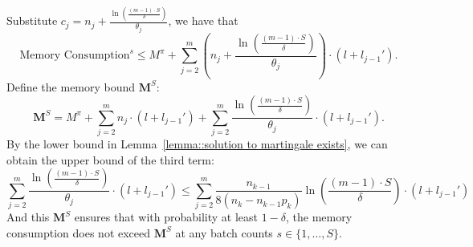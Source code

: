 Substitute \(c_j = n_j + \frac{\ln\left( \frac{(m - 1) \cdot S}{\delta} \right)}{\theta_j} \), we have that
$$    \text{Memory Consumption}^s \leq M^{\pi} + \sum_{j=2}^m \left( n_j + \frac{\ln\left( \frac{(m - 1) \cdot S}{\delta} \right)}{\theta_j} \right) \cdot (l + l_{j-1}').$$
Define the memory bound \( \mathbf{M}^S \):
$$\mathbf{M}^S = M^{\pi} + \sum_{j=2}^m n_j \cdot (l + l_{j-1}') + \sum_{j=2}^m \frac{\ln\left( \frac{(m - 1) \cdot S}{\delta} \right)}{\theta_j} \cdot (l + l_{j-1}').$$
By the lower bound in Lemma~\ref{lemma::solution to martingale exists}, we can obtain the upper bound of the third term:
$$\sum_{j=2}^m \frac{\ln\left( \frac{(m - 1) \cdot S}{\delta} \right)}{\theta_j} \cdot (l + l_{j-1}') \leq \sum_{j=2}^m \frac{n_{k-1}}{8(n_k - n_{k-1}p_k)}\ln\left( \frac{(m - 1) \cdot S}{\delta} \right)\cdot (l + l_{j-1}')$$
And this \( \mathbf{M}^S \) ensures that with probability at least \( 1 - \delta \), the memory consumption does not exceed \( \mathbf{M}^S \) at any batch counts \( s \in \{1, \dots, S\} \).




